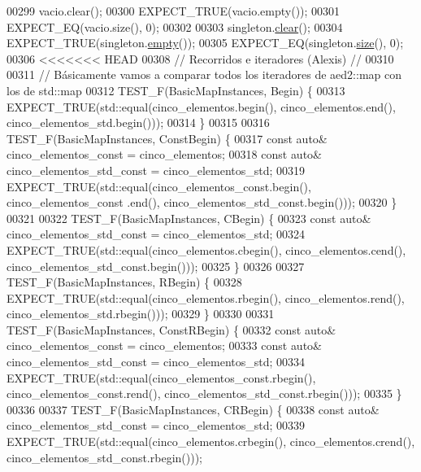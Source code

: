 \begin{DoxyCode}
00299     vacio.clear();
00300     EXPECT\_TRUE(vacio.empty());
00301     EXPECT\_EQ(vacio.size(), 0);
00302 
00303     singleton.\hyperlink{classaed2_1_1map_a2bfa5165825979bf2431db55bc6bc9ca_a2bfa5165825979bf2431db55bc6bc9ca}{clear}();
00304     EXPECT\_TRUE(singleton.\hyperlink{classaed2_1_1map_a0dcb39283f4877ae59cb756ed1d0c048_a0dcb39283f4877ae59cb756ed1d0c048}{empty}());
00305     EXPECT\_EQ(singleton.\hyperlink{classaed2_1_1map_aa6e806b3be6dc0da79adbfae08b571bf_aa6e806b3be6dc0da79adbfae08b571bf}{size}(), 0);
00306 
<<<<<<< HEAD
00308 \textcolor{comment}{// Recorridos e iteradores (Alexis) //}
00310 \textcolor{comment}{}
00311 \textcolor{comment}{// Básicamente vamos a comparar todos los iteradores de aed2::map con los de
       std::map}
00312 TEST\_F(BasicMapInstances, Begin) \{
00313     EXPECT\_TRUE(std::equal(cinco\_elementos.begin(), cinco\_elementos.end(), 
      cinco\_elementos\_std.begin()));
00314 \}
00315 
00316 TEST\_F(BasicMapInstances, ConstBegin) \{
00317     \textcolor{keyword}{const} \textcolor{keyword}{auto}& cinco\_elementos\_const = cinco\_elementos;
00318     \textcolor{keyword}{const} \textcolor{keyword}{auto}& cinco\_elementos\_std\_const = cinco\_elementos\_std;
00319     EXPECT\_TRUE(std::equal(cinco\_elementos\_const.begin(), cinco\_elementos\_const
      .end(), cinco\_elementos\_std\_const.begin()));
00320 \}
00321 
00322 TEST\_F(BasicMapInstances, CBegin) \{
00323     \textcolor{keyword}{const} \textcolor{keyword}{auto}& cinco\_elementos\_std\_const = cinco\_elementos\_std;
00324     EXPECT\_TRUE(std::equal(cinco\_elementos.cbegin(), cinco\_elementos.cend(), 
      cinco\_elementos\_std\_const.begin()));
00325 \}
00326 
00327 TEST\_F(BasicMapInstances, RBegin) \{
00328     EXPECT\_TRUE(std::equal(cinco\_elementos.rbegin(), cinco\_elementos.rend(), 
      cinco\_elementos\_std.rbegin()));
00329 \}
00330 
00331 TEST\_F(BasicMapInstances, ConstRBegin) \{
00332     \textcolor{keyword}{const} \textcolor{keyword}{auto}& cinco\_elementos\_const = cinco\_elementos;
00333     \textcolor{keyword}{const} \textcolor{keyword}{auto}& cinco\_elementos\_std\_const = cinco\_elementos\_std;
00334     EXPECT\_TRUE(std::equal(cinco\_elementos\_const.rbegin(), 
      cinco\_elementos\_const.rend(), cinco\_elementos\_std\_const.rbegin()));
00335 \}
00336 
00337 TEST\_F(BasicMapInstances, CRBegin) \{
00338     \textcolor{keyword}{const} \textcolor{keyword}{auto}& cinco\_elementos\_std\_const = cinco\_elementos\_std;
00339     EXPECT\_TRUE(std::equal(cinco\_elementos.crbegin(), cinco\_elementos.crend(), 
      cinco\_elementos\_std\_const.rbegin()));

\end{DoxyCode}

